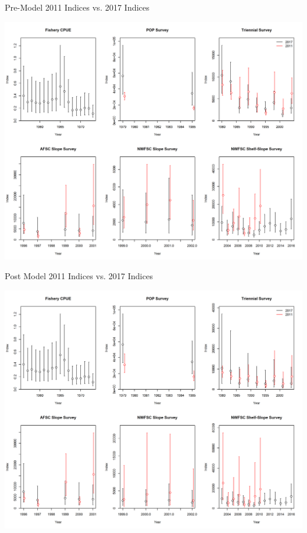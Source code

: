 \documentclass[pdf]{beamer}\usepackage[]{graphicx}\usepackage[]{color}
\begin{document}
\begin{frame}{Pre-Model 2011 Indices vs. 2017 Indices}
  \begin{center}
    \includegraphics[scale = 0.35]{figures/Index_Compare_2011_2017.png}
  \end{center}
\end{frame} 

\begin{frame}{Post Model 2011 Indices vs. 2017 Indices}
  \begin{center}
    \includegraphics[scale = 0.35]{figures/Index_Compare_PostModel_2011_2017.png}
  \end{center}
\end{frame} 
\end{document}

